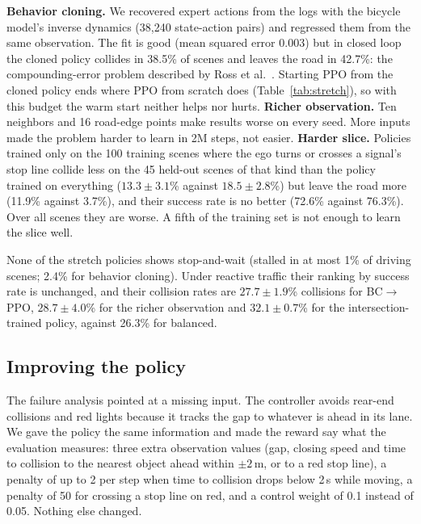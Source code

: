 \documentclass[conference]{IEEEtran}
\begin{document}
\textbf{Behavior cloning.} We recovered expert actions from the logs with the bicycle
model's inverse dynamics (38,240 state-action pairs) and regressed them from the same
observation. The fit is good (mean squared error 0.003) but in closed loop the cloned
policy collides in 38.5\% of scenes and leaves the road in 42.7\%: the compounding-error
problem described by Ross et al.~\cite{ross2011dagger}. Starting PPO from the cloned
policy ends where PPO from scratch does (Table~\ref{tab:stretch}), so with this budget
the warm start neither helps nor hurts.
\textbf{Richer observation.} Ten neighbors and 16 road-edge points make results worse
on every seed. More inputs made the problem harder to learn in 2M steps, not easier.
\textbf{Harder slice.} Policies trained only on the 100 training scenes where the ego
turns or crosses a signal's stop line collide less on the 45 held-out scenes of that
kind than the policy trained on everything ($13.3\pm3.1$\% against $18.5\pm2.8$\%) but
leave the road more (11.9\% against 3.7\%), and their success rate is no better (72.6\%
against 76.3\%). Over all scenes they are worse. A fifth of the training set is not
enough to learn the slice well.

None of the stretch policies shows stop-and-wait (stalled in at most 1\% of driving
scenes; 2.4\% for behavior cloning). Under reactive traffic their ranking by success rate is unchanged, and their collision rates are
$27.7\pm1.9$\% collisions for BC$\rightarrow$PPO, $28.7\pm4.0$\% for the richer observation
and $32.1\pm0.7$\% for the intersection-trained policy, against 26.3\% for balanced.

\subsection{Improving the policy}\label{sec:improved}

The failure analysis pointed at a missing input. The controller avoids rear-end
collisions and red lights because it tracks the gap to whatever is ahead in its lane.
We gave the policy the same information and made the reward say what the evaluation
measures: three extra observation values (gap, closing speed and time to collision to the
nearest object ahead within $\pm2$\,m, or to a red stop line), a penalty of up to 2 per
step when time to collision drops below 2\,s while moving, a penalty of 50 for crossing
a stop line on red, and a control weight of 0.1 instead of 0.05. Nothing else changed.
\end{document}
